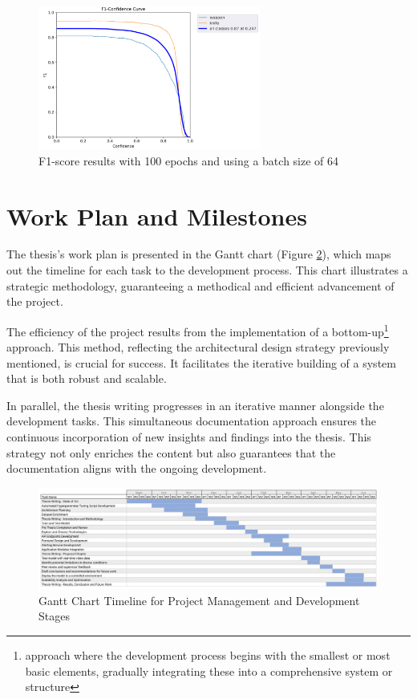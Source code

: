 \begin{figure}[h]
    \centering 
    \includegraphics[width=0.65\textwidth]{figs/f1-score.png} %
        \caption{F1-score results with 100 epochs and using a batch size of 64}
        \label{fig:f1-score}
\end{figure}

\section{Work Plan and Milestones}
The thesis's work plan is presented in the Gantt chart (Figure \ref{fig:gantt}), which maps out the timeline for each task to the development process. This chart illustrates a strategic methodology, guaranteeing a methodical and efficient advancement of the project. 

The efficiency of the project results from the implementation of a bottom-up\footnote{approach where the development process begins with the smallest or most basic elements, gradually integrating these into a comprehensive system or structure} approach. This method, reflecting the architectural design strategy previously mentioned, is crucial for success. It facilitates the iterative building of a system that is both robust and scalable.

In parallel, the thesis writing progresses in an iterative manner alongside the development tasks. This simultaneous documentation approach ensures the continuous incorporation of new insights and findings into the thesis. This strategy not only enriches the content but also guarantees that the documentation aligns with the ongoing development.

\begin{figure}[H]
    \centering
    \includegraphics[width=0.9\textheight, height=0.6\textwidth, keepaspectratio, angle=90]{figs/gantt.png}
    \caption{Gantt Chart Timeline for Project Management and Development Stages}
    \label{fig:gantt}
\end{figure}

